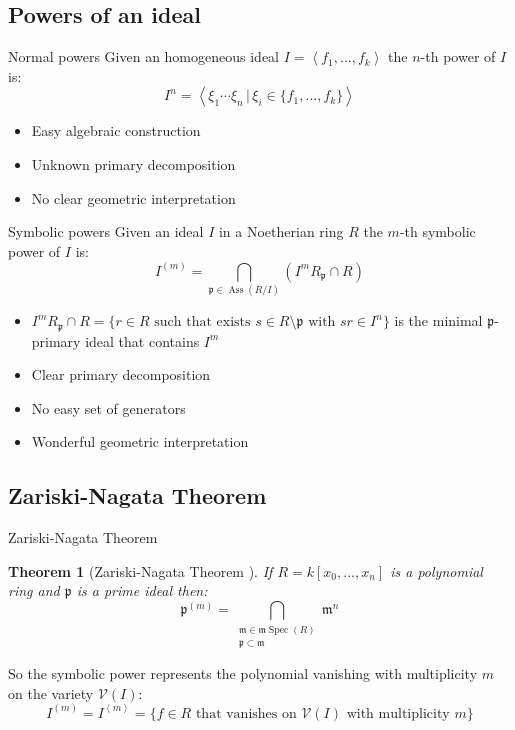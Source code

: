 \documentclass[dvipsnames]{beamer}
\theoremstyle{plain}
\newtheorem{teo}{Theorem}[section]
\theoremstyle{remark}
\theoremstyle{definition}
\newcommand{\p}{\mathfrak{p}}
\newcommand{\mm}{\mathfrak{m}}
\DeclareMathOperator{\Ass}{Ass}
\DeclareMathOperator{\Spec}{Spec}
\begin{document}
\subsection{Powers of an ideal}

\begin{frame}{Normal powers}
Given an homogeneous ideal $ I = \left\langle  f_1 , ... ,f_k \right\rangle  $ the $ n $-th power of $ I $ is: 
\[
 I^n = \left\langle \xi_1 \cdots \xi_n \,|\, \xi_i \in \{ f_1 , ... ,f_k \} \right\rangle 
\]
\pause
\begin{itemize}
\item Easy algebraic construction
\item Unknown primary decomposition %
\item No clear geometric interpretation 
\end{itemize}
\end{frame}

\begin{frame}{Symbolic powers}
Given an ideal $ I $ in a Noetherian ring $ R $ the $ m $-th symbolic power of $ I $ is:
\begin{equation*}\label{eq:sym_pow_def}
		I^{(m)} = \bigcap_{\p \in \Ass(R/I) } (I^m R_\p \cap R)
	\end{equation*}
\pause
\begin{itemize}
\item $ I^m R_\p \cap R = \{ r \in R \text{ such that exists } s \in R \setminus \p \text{ with } sr \in I^n\} $ is the minimal $ \p $-primary ideal that contains $ I^m $
\item Clear primary decomposition
\item No easy set of generators
\item Wonderful geometric interpretation
\end{itemize}
\end{frame}

\subsection{Zariski-Nagata Theorem}

\begin{frame}{Zariski-Nagata Theorem}
\begin{teo}[Zariski-Nagata Theorem \cite{Zar49, Nagata62}] \label{teo:zarnaga}
	If $ R = k[x_0 , ... , x_n] $ is a polynomial ring and $ \p $ is a prime ideal then:
	\begin{equation*}\label{eq:zar_nag_teo}
	\p^{(m)} = \bigcap_{\substack{ \mm \in \mm \Spec (R)\\ \p \subset \mm}} \mm ^n
	\end{equation*}
\end{teo}
\pause
So the symbolic power represents the polynomial vanishing with multiplicity $ m $ on the variety $ \mathcal{V}(I) $:
\begin{equation*}\label{eq:ideal_vanish}
	I^{(m)} = I^{\left<m\right>} = \{ f \in R \text{ that vanishes on } \mathcal{V}(I) \text{ with multiplicity } m\}
\end{equation*} 
\end{frame}
\end{document}
